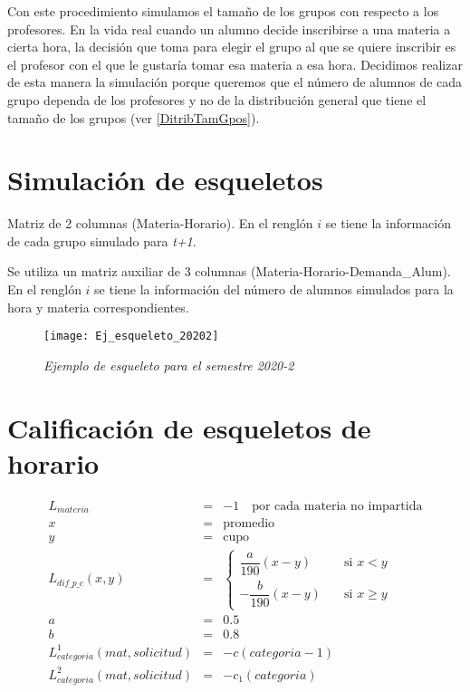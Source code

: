 Con este procedimiento simulamos el tamaño de los grupos con respecto a los profesores. En la vida real cuando un alumno decide inscribirse a una materia a cierta hora, la decisión que toma para elegir el grupo al que se quiere inscribir es el profesor con el que le gustaría tomar esa materia a esa hora. Decidimos realizar de esta manera la simulación porque queremos que el número de alumnos de cada grupo dependa de los profesores y no de la distribución general que tiene el tamaño de los grupos (ver \ref{DitribTamGpos}).







\section{Simulación de esqueletos}

Matriz de 2 columnas (Materia-Horario). En el renglón $i$ se tiene la información de cada grupo simulado para \textit{t+1}.

Se utiliza un matriz auxiliar de 3 columnas (Materia-Horario-Demanda\_Alum). En el renglón $i$ se tiene la información del número de alumnos simulados para la hora y materia correspondientes.

\begin{figure}[H]
\centering
\texttt{[image: Ej\_esqueleto\_20202]} %
\caption{\textit{Ejemplo de esqueleto para el semestre 2020-2}}\label{esqueleto20202}
\end{figure}

\section{Calificación de esqueletos de horario}

\begin{eqnarray*}
L_{materia} &=& -1 \,\,\,\,\,\,  \text{por cada materia no impartida}\\
x &=& \text{promedio}\\
y &=& \text{cupo}\\
L_{dif\_p\_c} (x,y) &=& \begin{cases}
    \dfrac{a}{190} (x-y)  & \quad \text{si } x<y\\
    - \dfrac{b}{190} (x-y)  & \quad \text{si } x\geqslant y
  \end{cases}\\
a &=& 0.5\\
b &=& 0.8\\
L_{categoria}^{1} (mat,solicitud) &=& -c(categoria - 1)\\
L_{categoria}^{2} (mat,solicitud) &=& -c_{1}(categoria)
\end{eqnarray*}

